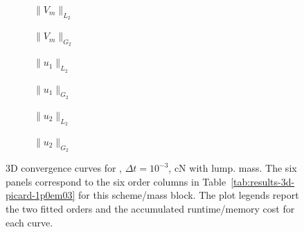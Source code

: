 \begin{figure}[p]
\centering
\begin{subfigure}{0.485\linewidth}
\centering
{}
\caption{$\|V_m\|_{L_2}$}
\label{fig:results-3d-picard-1p0em03-cranknicolson-lumped-a}
\end{subfigure}
\hfill
\begin{subfigure}{0.485\linewidth}
\centering
{}
\caption{$\|V_m\|_{G_2}$}
\label{fig:results-3d-picard-1p0em03-cranknicolson-lumped-b}
\end{subfigure}
\par\vspace{0.8em}
\begin{subfigure}{0.485\linewidth}
\centering
{}
\caption{$\|u_1\|_{L_2}$}
\label{fig:results-3d-picard-1p0em03-cranknicolson-lumped-c}
\end{subfigure}
\hfill
\begin{subfigure}{0.485\linewidth}
\centering
{}
\caption{$\|u_1\|_{G_2}$}
\label{fig:results-3d-picard-1p0em03-cranknicolson-lumped-d}
\end{subfigure}
\par\vspace{0.8em}
\begin{subfigure}{0.485\linewidth}
\centering
{}
\caption{$\|u_2\|_{L_2}$}
\label{fig:results-3d-picard-1p0em03-cranknicolson-lumped-e}
\end{subfigure}
\hfill
\begin{subfigure}{0.485\linewidth}
\centering
{}
\caption{$\|u_2\|_{G_2}$}
\label{fig:results-3d-picard-1p0em03-cranknicolson-lumped-f}
\end{subfigure}
\caption{3D convergence curves for , $\Delta t=10^{-3}$, cN with lump. mass. The six panels correspond to the six order columns in Table~\ref{tab:results-3d-picard-1p0em03} for this scheme/mass block. The plot legends report the two fitted orders and the accumulated runtime/memory cost for each curve.}
\label{fig:results-3d-picard-1p0em03-cranknicolson-lumped}
\end{figure}
\FloatBarrier

